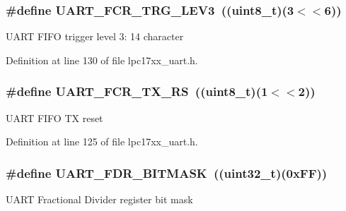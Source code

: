 \subsubsection[{\texorpdfstring{U\+A\+R\+T\+\_\+\+F\+C\+R\+\_\+\+T\+R\+G\+\_\+\+L\+E\+V3}{UART_FCR_TRG_LEV3}}]{\setlength{\rightskip}{0pt plus 5cm}\#define U\+A\+R\+T\+\_\+\+F\+C\+R\+\_\+\+T\+R\+G\+\_\+\+L\+E\+V3~(({\bf uint8\+\_\+t})(3$<$$<$6))}\hypertarget{group___u_a_r_t___private___macros_ga9e6ef12c7a1f3514d6e30d7548ed3e46}{}\label{group___u_a_r_t___private___macros_ga9e6ef12c7a1f3514d6e30d7548ed3e46}
U\+A\+RT F\+I\+FO trigger level 3\+: 14 character 

Definition at line 130 of file lpc17xx\+\_\+uart.\+h.

\subsubsection[{\texorpdfstring{U\+A\+R\+T\+\_\+\+F\+C\+R\+\_\+\+T\+X\+\_\+\+RS}{UART_FCR_TX_RS}}]{\setlength{\rightskip}{0pt plus 5cm}\#define U\+A\+R\+T\+\_\+\+F\+C\+R\+\_\+\+T\+X\+\_\+\+RS~(({\bf uint8\+\_\+t})(1$<$$<$2))}\hypertarget{group___u_a_r_t___private___macros_ga1c1a83fcacf333309330eea460d8a6a6}{}\label{group___u_a_r_t___private___macros_ga1c1a83fcacf333309330eea460d8a6a6}
U\+A\+RT F\+I\+FO TX reset 

Definition at line 125 of file lpc17xx\+\_\+uart.\+h.

\subsubsection[{\texorpdfstring{U\+A\+R\+T\+\_\+\+F\+D\+R\+\_\+\+B\+I\+T\+M\+A\+SK}{UART_FDR_BITMASK}}]{\setlength{\rightskip}{0pt plus 5cm}\#define U\+A\+R\+T\+\_\+\+F\+D\+R\+\_\+\+B\+I\+T\+M\+A\+SK~(({\bf uint32\+\_\+t})(0x\+F\+F))}\hypertarget{group___u_a_r_t___private___macros_ga61a8f74c3fc22574793c6218b90fec50}{}\label{group___u_a_r_t___private___macros_ga61a8f74c3fc22574793c6218b90fec50}
U\+A\+RT Fractional Divider register bit mask 

